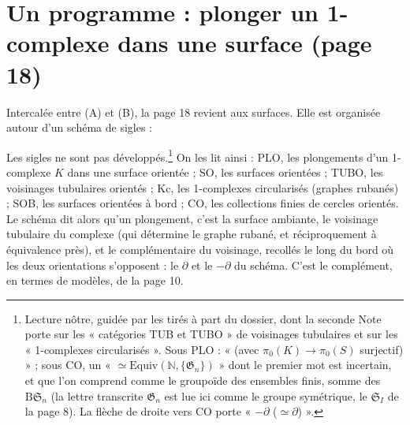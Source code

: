 \documentclass[11pt,a4paper]{article}
\begin{document}
\section*{Un programme : plonger un 1-complexe dans une surface (page 18)}

Intercalée entre (A) et (B), la page 18 revient aux surfaces. Elle est
organisée autour d'un schéma de sigles :


Les sigles ne sont pas développés.\footnote{Lecture nôtre, guidée par les
tirés à part du dossier, dont la seconde Note porte sur les « catégories TUB
et TUBO » de voisinages tubulaires et sur les « 1-complexes circularisés ».
Sous PLO : « (avec $\pi_0(K) \to \pi_0(S)$ surjectif) » ; sous CO, un
« $\simeq \mathrm{Equiv}(\mathbb{N}, \{\mathfrak{G}_n\})$ » dont le premier
mot est incertain, et que l'on comprend comme le groupoïde des ensembles finis,
somme des $\mathrm{B}\mathfrak{S}_n$ (la lettre transcrite $\mathfrak{G}_n$
est lue ici comme le groupe symétrique, le $\mathfrak{S}_I$ de la page 8).
La flèche de droite vers CO porte « $-\partial$ ($\simeq \partial$) ».} On
les lit ainsi : PLO, les plongements d'un 1-complexe $K$ dans une surface
orientée ; SO, les surfaces orientées ; TUBO, les voisinages tubulaires
orientés ; Kc, les 1-complexes circularisés (graphes rubanés) ; SOB, les
surfaces orientées à bord ; CO, les collections finies de cercles orientés.
Le schéma dit alors qu'un plongement, c'est la surface ambiante, le voisinage
tubulaire du complexe (qui détermine le graphe rubané, et réciproquement à
équivalence près), et le complémentaire du voisinage, recollés le long du bord
où les deux orientations s'opposent : le $\partial$ et le $-\partial$ du
schéma. C'est le complément, en termes de modèles, de la page 10.
\end{document}
